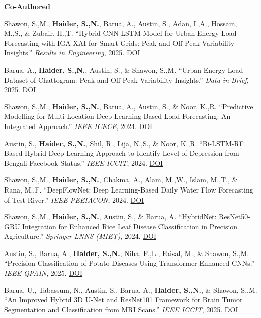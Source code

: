 \documentclass[10pt]{article}
\begin{document}
\vspace{2pt}
\textbf{\small Co-Authored}
\vspace{2pt}
\begin{enumerate}[leftmargin=18pt, itemsep=2pt, topsep=2pt, label={[\arabic*]}]
\item Shawon, S.,M., \textbf{Haider, S.,N.}, Barua, A., Austin, S., Adan, I.,A., Hossain, M.,S., \& Zubair, H.,T. ``Hybrid CNN-LSTM Model for Urban Energy Load Forecasting with IGA-XAI for Smart Grids: Peak and Off-Peak Variability Insights.'' \textit{Results in Engineering}, 2025.
\href{https://doi.org/10.1016/j.rineng.2025.107245}{DOI}

\item Barua, A., \textbf{Haider, S.,N.}, Austin, S., \& Shawon, S.,M. ``Urban Energy Load Dataset of Chattogram: Peak and Off-Peak Variability Insights.'' \textit{Data in Brief}, 2025.
\href{https://doi.org/10.1016/j.dib.2025.112245}{DOI}

\item Shawon, S.,M., \textbf{Haider, S.,N.}, Barua, A., Austin, S., \& Noor, K.,R. ``Predictive Modelling for Multi-Location Deep Learning-Based Load Forecasting: An Integrated Approach.'' \textit{IEEE ICECE}, 2024.
\href{https://doi.org/10.1109/ICECE64886.2024.11024879}{DOI}

\item Austin, S., \textbf{Haider, S.,N.}, Shil, R., Lija, N.,S., \& Noor, K.,R. ``Bi-LSTM-RF Based Hybrid Deep Learning Approach to Identify Level of Depression from Bengali Facebook Status.'' \textit{IEEE ICCIT}, 2024.
\href{https://doi.org/10.1109/ICCIT64611.2024.11022340}{DOI}

\item Shawon, S.,M., \textbf{Haider, S.,N.}, Chakma, A., Alam, M.,W., Islam, M.,T., \& Rana, M.,F. ``DeepFlowNet: Deep Learning-Based Daily Water Flow Forecasting of Test River.'' \textit{IEEE PEEIACON}, 2024.
\href{https://doi.org/10.1109/PEEIACON63629.2024.10800657}{DOI}

\item Shawon, S.,M., \textbf{Haider, S.,N.}, Austin, S., \& Barua, A. ``HybridNet: ResNet50-GRU Integration for Enhanced Rice Leaf Disease Classification in Precision Agriculture.'' \textit{Springer LNNS (MIET)}, 2024.
\href{https://doi.org/10.1007/978-981-96-2721-9_39}{DOI}

\item Austin, S., Barua, A., \textbf{Haider, S.,N.}, Niha, F.,L., Faisal, M., \& Shawon, S.,M. ``Precision Classification of Potato Diseases Using Transformer-Enhanced CNNs.'' \textit{IEEE QPAIN}, 2025.
\href{https://doi.org/10.1109/QPAIN66474.2025.11172153}{DOI}

\item Barua, U., Tabassum, N., Austin, S., Barua, A., \textbf{Haider, S.,N.}, \& Shawon, S.,M. ``An Improved Hybrid 3D U-Net and ResNet101 Framework for Brain Tumor Segmentation and Classification from MRI Scans.'' \textit{IEEE ICCIT}, 2025.
\href{https://doi.org/10.1109/ICCIT68739.2025.11491629}{DOI}
\end{enumerate}
\end{document}
